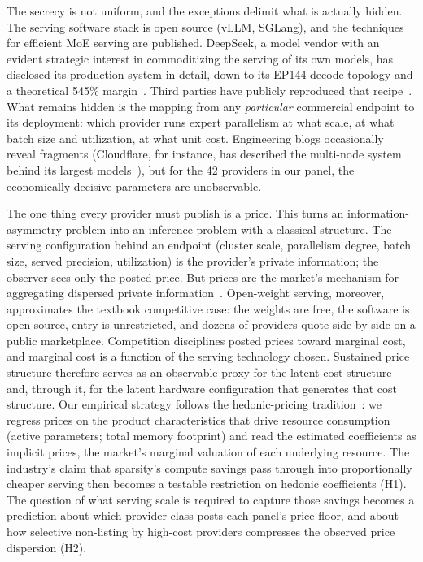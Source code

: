 \documentclass[11pt]{article}
\begin{document}
The secrecy is not uniform, and the exceptions delimit what is actually
hidden. The serving software stack is open source (vLLM, SGLang), and the techniques for efficient MoE serving are published. DeepSeek, a model vendor with an evident strategic interest in commoditizing the serving of its own models, has disclosed its production system in detail, down to its EP144 decode topology and a theoretical 545\% margin~\cite{r10}. Third parties have publicly reproduced that recipe~\cite{r8}. What remains hidden is the mapping
from any \emph{particular} commercial endpoint to its deployment: which
provider runs expert parallelism at what scale, at what batch size and
utilization, at what unit cost. Engineering blogs occasionally reveal
fragments (Cloudflare, for instance, has described the multi-node system
behind its largest models~\cite{r19}), but for the 42 providers in our
panel, the economically decisive parameters are unobservable.

The one thing every provider must publish is a price. This turns an
information-asymmetry problem into an inference problem with a classical
structure. The serving configuration behind an endpoint (cluster scale,
parallelism degree, batch size, served precision, utilization) is the
provider's private information; the observer sees only the posted price. But prices are the market's mechanism for aggregating dispersed private information~\cite{r26}. Open-weight serving, moreover, approximates the textbook competitive case: the weights are free, the software is open source, entry is
unrestricted, and dozens of providers quote side by side on a public
marketplace. Competition disciplines posted prices toward marginal cost, and
marginal cost is a function of the serving technology chosen. Sustained price
structure therefore serves as an observable proxy for the latent cost
structure and, through it, for the latent hardware configuration that
generates that cost structure. Our empirical strategy follows the
hedonic-pricing tradition~\cite{r27}: we regress prices on the product
characteristics that drive resource consumption (active parameters; total
memory footprint) and read the estimated coefficients as implicit prices, the
market's marginal valuation of each underlying resource. The industry's claim
that sparsity's compute savings pass through into proportionally cheaper
serving then becomes a testable restriction on hedonic coefficients (H1). The question of what serving scale is required to capture those savings becomes a prediction about which provider class posts each panel's price floor, and about how selective non-listing by high-cost providers compresses the observed price dispersion (H2).
\end{document}
